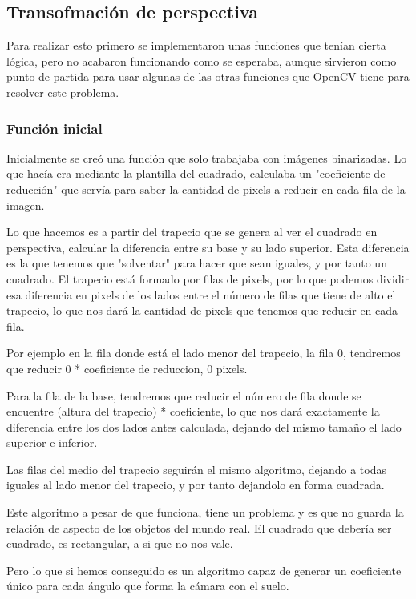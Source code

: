 \subsection{Transofmación de perspectiva}
Para realizar esto primero se implementaron unas funciones que tenían cierta lógica, pero no acabaron funcionando como se esperaba, aunque sirvieron como punto de partida para usar algunas de las otras funciones que OpenCV tiene para resolver este problema.

\subsubsection{Función inicial}

Inicialmente se creó una función que solo trabajaba con imágenes binarizadas. Lo que hacía era mediante la plantilla del cuadrado, calculaba un "coeficiente de reducción" que servía para saber la cantidad de pixels a reducir en cada fila de la imagen. 

Lo que hacemos es a partir del trapecio que se genera al ver el cuadrado en perspectiva, calcular la diferencia entre su base y su lado superior. Esta diferencia es la que tenemos que "solventar" para hacer que sean iguales, y por tanto un cuadrado. 
El trapecio está formado por filas de pixels, por lo que podemos dividir esa diferencia en pixels de los lados entre el número de filas que tiene de alto el trapecio, lo que nos dará la cantidad de pixels que tenemos que reducir en cada fila.

Por ejemplo en la fila donde está el lado menor del trapecio, la fila 0, tendremos que reducir 0 * coeficiente de reduccion, 0 pixels.

Para la fila de la base, tendremos que reducir el número de fila donde se encuentre (altura del trapecio) * coeficiente, lo que nos dará exactamente la diferencia entre los dos lados antes calculada, dejando del mismo tamaño el lado superior e inferior.

Las filas del medio del trapecio seguirán el mismo algoritmo, dejando a todas iguales al lado menor del trapecio, y por tanto dejandolo en forma cuadrada.

Este algoritmo a pesar de que funciona, tiene un problema y es que no guarda la relación de aspecto de los objetos del mundo real. El cuadrado que debería ser cuadrado, es rectangular, a si que no nos vale.

Pero lo que si hemos conseguido es un algoritmo capaz de generar un coeficiente único para cada ángulo que forma la cámara con el suelo.


